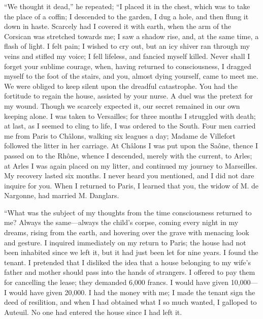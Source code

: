 “We thought it dead,” he repeated; “I placed it in the chest, which was
to take the place of a coffin; I descended to the garden, I dug a hole,
and then flung it down in haste. Scarcely had I covered it with earth,
when the arm of the Corsican was stretched towards me; I saw a shadow
rise, and, at the same time, a flash of light. I felt pain; I wished to
cry out, but an icy shiver ran through my veins and stifled my voice; I
fell lifeless, and fancied myself killed. Never shall I forget your
sublime courage, when, having returned to consciousness, I dragged
myself to the foot of the stairs, and you, almost dying yourself, came
to meet me. We were obliged to keep silent upon the dreadful
catastrophe. You had the fortitude to regain the house, assisted by
your nurse. A duel was the pretext for my wound. Though we scarcely
expected it, our secret remained in our own keeping alone. I was taken
to Versailles; for three months I struggled with death; at last, as I
seemed to cling to life, I was ordered to the South. Four men carried
me from Paris to Châlons, walking six leagues a day; Madame de
Villefort followed the litter in her carriage. At Châlons I was put
upon the Saône, thence I passed on to the Rhône, whence I descended,
merely with the current, to Arles; at Arles I was again placed on my
litter, and continued my journey to Marseilles. My recovery lasted six
months. I never heard you mentioned, and I did not dare inquire for
you. When I returned to Paris, I learned that you, the widow of M. de
Nargonne, had married M. Danglars.

“What was the subject of my thoughts from the time consciousness
returned to me? Always the same—always the child’s corpse, coming every
night in my dreams, rising from the earth, and hovering over the grave
with menacing look and gesture. I inquired immediately on my return to
Paris; the house had not been inhabited since we left it, but it had
just been let for nine years. I found the tenant. I pretended that I
disliked the idea that a house belonging to my wife’s father and mother
should pass into the hands of strangers. I offered to pay them for
cancelling the lease; they demanded 6,000 francs. I would have given
10,000—I would have given 20,000. I had the money with me; I made the
tenant sign the deed of resilition, and when I had obtained what I so
much wanted, I galloped to Auteuil. No one had entered the house since
I had left it.

